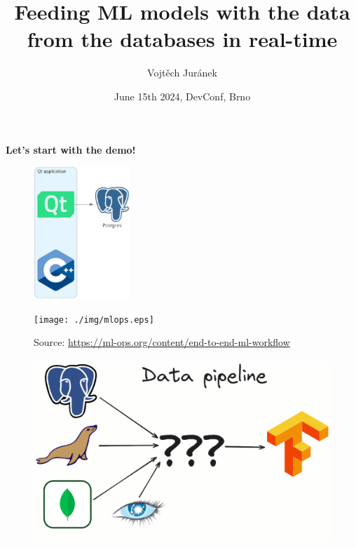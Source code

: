 \documentclass[10pt,utf8]{beamer}
\title{Feeding ML models with the data from the databases in real-time }
\author{Vojtěch Juránek}
\institute[Red Hat]{Red Hat}
\date{June 15th 2024, DevConf, Brno}
\begin{document}

\begin{frame}
    \centering
    \huge{\textbf{Let's start with the demo!}}
    \vspace{1cm}
    \begin{figure}
        \centering
        \includegraphics[height=5cm]{./img/qt_to_postgres.eps}
    \end{figure}
\end{frame}

\begin{frame}
 \titlepage
\end{frame}


\begin{frame}
    \begin{figure}
        \centering
        \texttt{[image: ./img/mlops.eps]}
        \caption{\tiny{Source: \url{https://ml-ops.org/content/end-to-end-ml-workflow}}}
    \end{figure}
\end{frame}

\begin{frame}
    \begin{figure}
        \centering
        \includegraphics[height=7cm]{./img/dbs_to_tf2.eps}
    \end{figure}
\end{frame}
\end{document}
